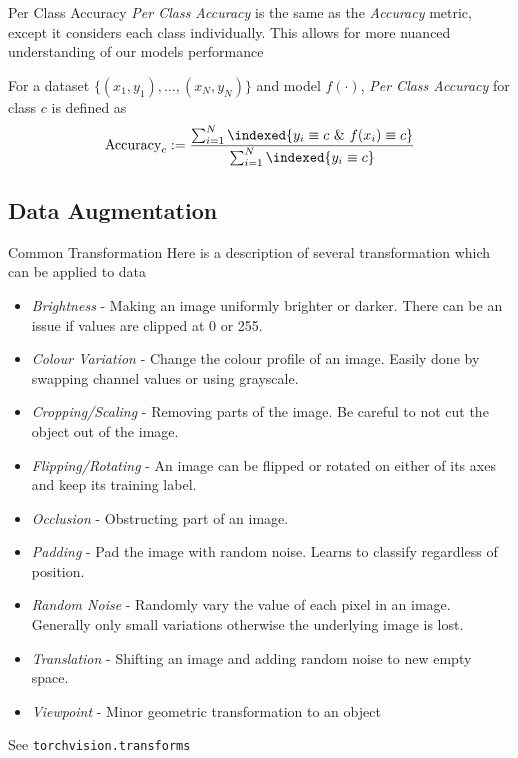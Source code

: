 \documentclass[11pt,a4paper]{article}
\begin{document}
  \begin{definition}{Per Class Accuracy}
    \textit{Per Class Accuracy} is the same as the \textit{Accuracy} metric, except it considers each class individually. This allows for more nuanced understanding of our models performance
    \par For a dataset $\{(x_1,y_1),\dots,(x_N,y_N)\}$ and model $f(\cdot)$, \textit{Per Class Accuracy} for class $c$ is defined as
    \[ \text{Accuracy}_c:=\frac{\sum_{i=1}^N\indexed\{y_i\equiv c\ \&\ f(x_i)\equiv c\}}{\sum_{i=1}^N\indexed\{y_i\equiv c\}} \]
  \end{definition}

\subsection{Data Augmentation}

  \begin{definition}{Common Transformation}
    Here is a description of several transformation which can be applied to data
    \begin{itemize}
      \item \textit{Brightness} - Making an image uniformly brighter or darker. There can be an issue if values are clipped at 0 or 255.
      \item \textit{Colour Variation} - Change the colour profile of an image. Easily done by swapping channel values or using grayscale.
      \item \textit{Cropping/Scaling} - Removing parts of the image. Be careful to not cut the object out of the image.
      \item \textit{Flipping/Rotating} - An image can be flipped or rotated on either of its axes and keep its training label.
      \item \textit{Occlusion} - Obstructing part of an image.
      \item \textit{Padding} - Pad the image with random noise. Learns to classify regardless of position.
      \item \textit{Random Noise} - Randomly vary the value of each pixel in an image. Generally only small variations otherwise the underlying image is lost.
      \item \textit{Translation} - Shifting an image and adding random noise to new empty space.
      \item \textit{Viewpoint} - Minor geometric transformation to an object
    \end{itemize}
    See \texttt{torchvision.transforms}
  \end{definition}
\end{document}
